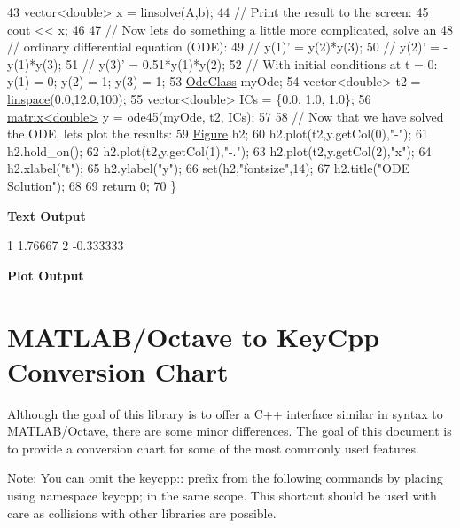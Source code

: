 \begin{DoxyCodeInclude}
43     vector<double> x = linsolve(A,b);
44     \textcolor{comment}{// Print the result to the screen:}
45     cout << x;
46 
47     \textcolor{comment}{// Now lets do something a little more complicated, solve an}
48     \textcolor{comment}{// ordinary differential equation (ODE):}
49     \textcolor{comment}{// y(1)' = y(2)*y(3);}
50     \textcolor{comment}{// y(2)' = -y(1)*y(3);}
51     \textcolor{comment}{// y(3)' = 0.51*y(1)*y(2);}
52     \textcolor{comment}{// With initial conditions at t = 0: y(1) = 0; y(2) = 1; y(3) = 1;}
53     \hyperlink{class_ode_class}{OdeClass} myOde;
54     vector<double> t2 = \hyperlink{namespacekeycpp_ab57eee495c93eb18ebf8c8ccf4d44e74}{linspace}(0.0,12.0,100);
55     vector<double> ICs = \{0.0, 1.0, 1.0\};
56     \hyperlink{classkeycpp_1_1matrix}{matrix<double>} y = ode45(myOde, t2, ICs);
57     
58     \textcolor{comment}{// Now that we have solved the ODE, lets plot the results:}
59     \hyperlink{classkeycpp_1_1_figure}{Figure} h2;
60     h2.plot(t2,y.getCol(0),\textcolor{stringliteral}{"-"});
61     h2.hold\_on();
62     h2.plot(t2,y.getCol(1),\textcolor{stringliteral}{"-."});
63     h2.plot(t2,y.getCol(2),\textcolor{stringliteral}{"x"});
64     h2.xlabel(\textcolor{stringliteral}{"t"});
65     h2.ylabel(\textcolor{stringliteral}{"y"});
66     \textcolor{keyword}{set}(h2,\textcolor{stringliteral}{"fontsize"},14);
67     h2.title(\textcolor{stringliteral}{"ODE Solution"});
68     
69     \textcolor{keywordflow}{return} 0;
70 \}
\end{DoxyCodeInclude}
 \par
 {\bfseries {\ttfamily Text} Output} 
\begin{DoxyCodeInclude}
1 1.76667
2 -0.333333
\end{DoxyCodeInclude}
 \par
 {\bfseries {\ttfamily Plot} Output}  \par
  \par


\section*{M\-A\-T\-L\-A\-B/\-Octave to Key\-Cpp Conversion Chart}

Although the goal of this library is to offer a C++ interface similar in syntax to M\-A\-T\-L\-A\-B/\-Octave, there are some minor differences. The goal of this document is to provide a conversion chart for some of the most commonly used features.

Note\-: You can omit the {\ttfamily keycpp\-:\-:} prefix from the following commands by placing {\ttfamily using namespace keycpp;} in the same scope. This shortcut should be used with care as collisions with other libraries are possible.

